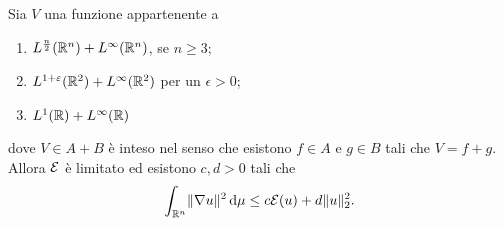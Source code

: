 \begin{teorema} \label{t:limitatezza-funzionale-energia-schroedinger}
    Sia $V$ una funzione appartenente a
    \begin{enumerate}
        \item $\leb[\frac{n}2]{\R^n}+\leb[\infty]{\R^n}$, se $n\ge 3$;
        \item $\leb[1+\epsilon]{\R^2}+\leb[\infty]{\R^2}$ per un $\epsilon>0$;
        \item $\leb[1]{\R}+\leb[\infty]{\R}$
    \end{enumerate}
    dove $V\in A+B$ è inteso nel senso che esistono $f\in A$ e $g\in B$ tali che $V=f+g$.
    Allora $\E$ è limitato ed esistono $c,d>0$ tali che
    \begin{equation}
        \int_{\R^n}\norm{\grad u}^2\,\dd\mu\le c\E(u)+d\norm{u}_2^2.
    \end{equation}
\end{teorema}

